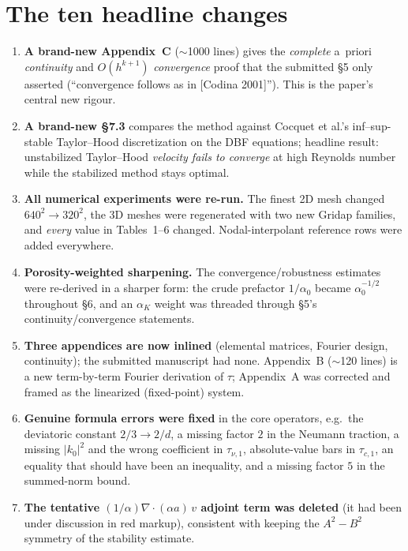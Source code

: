 \documentclass[11pt]{article}
\begin{document}
\section*{The ten headline changes}
\begin{enumerate}[leftmargin=1.7em,itemsep=3pt]
\item \textbf{A brand-new Appendix~C} ($\sim$1000 lines) gives the \emph{complete} a~priori
  \emph{continuity} and $O(h^{k+1})$ \emph{convergence} proof that the submitted \S5 only asserted
  (``convergence follows as in [Codina 2001]''). This is the paper's central new rigour.
\item \textbf{A brand-new \S7.3} compares the method against Cocquet et al.'s inf--sup-stable
  Taylor--Hood discretization on the DBF equations; headline result: unstabilized Taylor--Hood
  \emph{velocity fails to converge} at high Reynolds number while the stabilized method stays optimal.
\item \textbf{All numerical experiments were re-run.} The finest 2D mesh changed $640^2\to320^2$,
  the 3D meshes were regenerated with two new Gridap families, and \emph{every} value in Tables~1--6
  changed. Nodal-interpolant reference rows were added everywhere.
\item \textbf{Porosity-weighted sharpening.} The convergence/robustness estimates were re-derived
  in a sharper form: the crude prefactor $1/\alpha_0$ became $\alpha_0^{-1/2}$ throughout \S6, and an
  $\alpha_K$ weight was threaded through \S5's continuity/convergence statements.
\item \textbf{Three appendices are now inlined} (elemental matrices, Fourier design, continuity);
  the submitted manuscript had none. Appendix~B ($\sim$120 lines) is a new term-by-term Fourier
  derivation of $\tau$; Appendix~A was corrected and framed as the linearized (fixed-point) system.
\item \textbf{Genuine formula errors were fixed} in the core operators, e.g.\ the deviatoric
  constant $2/3\to2/d$, a missing factor $2$ in the Neumann traction, a missing $|k_0|^2$ and the
  wrong coefficient in $\tau_{\nu,1}$, absolute-value bars in $\tau_{c,1}$, an equality that should
  have been an inequality, and a missing factor $5$ in the summed-norm bound.
\item \textbf{The tentative $(1/\alpha)\nabla\!\cdot\!(\alpha a)\,v$ adjoint term was deleted}
  (it had been under discussion in red markup), consistent with keeping the $A^2-B^2$ symmetry of
  the stability estimate.

\end{enumerate}
\end{document}
